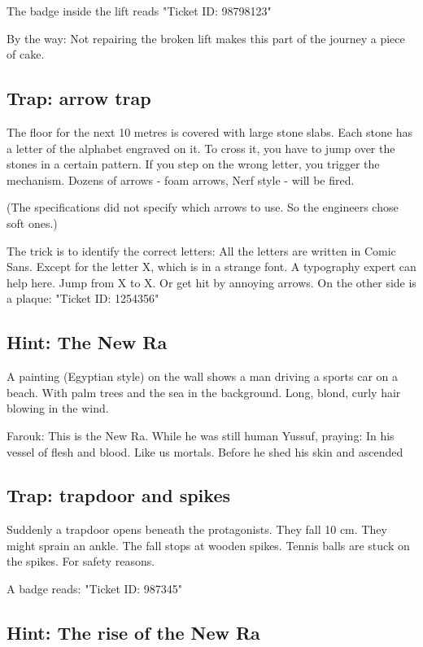 The badge inside the lift reads "Ticket ID: 98798123"

By the way: Not repairing the broken lift makes this part of the journey a piece of cake.

\subsection{Trap: arrow trap}

The floor for the next 10 metres is covered with large stone slabs. Each stone has a letter of the alphabet engraved on it. To cross it, you have to jump over the stones in a certain pattern. If you step on the wrong letter, you trigger the mechanism. Dozens of arrows - foam arrows, Nerf style - will be fired.

(The specifications did not specify which arrows to use. So the engineers chose soft ones.)

The trick is to identify the correct letters: All the letters are written in Comic Sans. Except for the letter X, which is in a strange font. A typography expert can help here. Jump from X to X. Or get hit by annoying arrows. On the other side is a plaque: "Ticket ID: 1254356"

\subsection{Hint: The New Ra}

A painting (Egyptian style) on the wall shows a man driving a sports car on a beach. With palm trees and the sea in the background. Long, blond, curly hair blowing in the wind.

Farouk: This is the New Ra. While he was still human
Yussuf, praying: In his vessel of flesh and blood. Like us mortals. Before he shed his skin and ascended

\subsection{Trap: trapdoor and spikes}

Suddenly a trapdoor opens beneath the protagonists. They fall 10 cm. They might sprain an ankle. The fall stops at wooden spikes. Tennis balls are stuck on the spikes. For safety reasons.

A badge reads: "Ticket ID: 987345"

\subsection{Hint: The rise of the New Ra}

